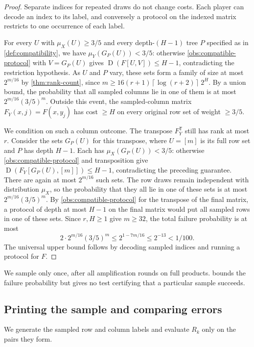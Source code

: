\documentclass[11pt,letterpaper]{article} \usepackage[utf8]{inputenc}
\theoremstyle{plain} \newtheorem{theorem}{Theorem}[section]
\theoremstyle{definition} \newaliascnt{definition}{theorem}
\newcommand{\D}{\operatorname{D}}
\newcommand{\ceil}[1]{\left\lceil#1\right\rceil}
\begin{document}
\begin{proof}
Separate indices for repeated draws do not change costs. Each player can decode an index to its label, and conversely a protocol on
the indexed matrix restricts to one occurrence of each label.

For every $U$ with $\mu_X(U)\ge3/5$ and every depth-$(H-1)$ tree
$P$ specified as in \cref{def:compatibility}, we have $\mu_Y(G_P(U))<3/5$: otherwise
\cref{obs:compatible-protocol} with $V=G_P(U)$ gives $\D(F[U,V])\le H-1$,
contradicting the restriction hypothesis. As $U$ and
$P$ vary, these sets form a family of size at most
$2^{m/16}$ by \cref{thm:rank-count}, since $m\ge16(r+1)\ceil{\log(r+2)}\,2^H$. By a union bound, the probability that all sampled
columns lie in one of them is at most $2^{m/16}(3/5)^m$.
Outside this event, the sampled-column matrix
$F_Y(x,j)=F(x,y_j)$ has cost $\ge H$ on every original row set of weight
$\ge3/5$.

We condition on such a column outcome. The transpose $F_Y^{\mathsf T}$ still has
rank at most $r$. Consider the sets $G_P(U)$ for this transpose, where $U=[m]$ is
its full row set and $P$ has depth $H-1$. Each has $\mu_X(G_P(U))<3/5$: otherwise
\cref{obs:compatible-protocol} and transposition give
$\D(F_Y[G_P(U),[m]])\le H-1$, contradicting the preceding guarantee. There are again at most $2^{m/16}$ such sets.
The row draws remain independent with distribution $\mu_X$, so the probability that
they all lie in one of these sets is at most $2^{m/16}(3/5)^m$. By \cref{obs:compatible-protocol} for the transpose of the final matrix, a protocol of depth at most
$H-1$ on the final matrix would put all sampled rows in one of these sets. Since $r,H\ge1$ give $m\ge32$,
the total failure probability is at most
\[
2\cdot2^{m/16}(3/5)^m\le2^{1-7m/16}\le2^{-13}<1/100.
\]
The universal upper bound follows by decoding sampled indices and running a
protocol for $F$.
\end{proof}

We sample only once, after all amplification rounds on full products.
 bounds the failure probability but gives no test
certifying that a particular sample succeeds.

\subsection{Printing the sample and comparing errors}
\label{sec:reduction}
\label{sec:randomised_reduction}

We generate the sampled row and column labels and evaluate $R_k$ only on
the pairs they form.
\end{document}
